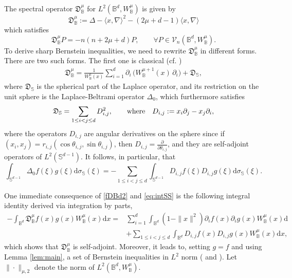\documentclass{amsart}
\theoremstyle{remark}
\def\la{{\langle}}
\def\ra{{\rangle}}
\def\d{\mathrm{d}}
\def\sph{{\mathbb{S}^{d-1}}}
\def\fD{{\mathfrak D}}
\def\t{{\theta}}
\def\s{\sigma}
\def\la{{\langle}}
\def\ra{{\rangle}}
\def\CV{{\mathcal V}}
\def\BB{{\mathbb B}}
\def\SS{{\mathbb S}}
\begin{document}
The spectral operator $\fD_\BB^\mu$ for $L^2(\BB^d, W_\BB^\mu)$ is given by \cite[(5.2.3)]{DX}
\begin{equation} \label{eq:fD_Bd}
  \fD_\BB^\mu:= \Delta - \la x, \nabla \ra^2 - (2\mu + d-1) \la x, \nabla \ra 
\end{equation}
which satisfies 
\begin{equation} \label{eq:eigenB}
  \fD^\mu_\BB P = - n (n+ 2 \mu + d) P, \qquad \forall P \in \CV_n(\BB^d, W_\BB^\mu). 
\end{equation}
To derive sharp Bernstein inequalities, we need to rewrite $\fD_\BB^\mu$ in different forms. There are two
such forms. The first one is classical (cf. \cite[Proposition 7.1]{DaiX1}) 
\begin{align}\label{fDBd2}
  \fD^{\mu}_\BB =  \frac{1}{W_\BB^\mu(x)}\sum_{i=1}^{d} \partial_{i}\,\!\big(W_\BB^{\mu+1}(x)\,\partial_{i}\big) 
    + \fD_\SS,
\end{align}
where $\fD_\SS$ is the spherical part of the Laplace operator, and its restriction on the unit sphere is the 
Laplace-Beltrami operator $\Delta_0$, which furthermore satisfies \cite[(1.8.3)]{DaiX}
\begin{align}\label{fD_SS}
\fD_\SS = \sum_{1 \le i < j \le d} D_{i,j}^2, \qquad \hbox{where} \quad  D_{i,j}: = x_i \partial_j - x_j \partial_i,
\end{align}
where the operators $D_{i,j}$ are angular derivatives on the sphere \cite[(1.8.1)]{DaiX} since if 
$(x_i,x_j) = r_{i,j}(\cos \t_{i,j}, \sin \t_{i,j})$, then $D_{i,j} = \frac{\partial}{\partial \t_{i,j}}$, and they 
are self-adjoint operators of $L^2(\sph)$. It follows, in particular, that \cite[Section 1.8]{DaiX}
\begin{equation} \label{eq:intSS}
  \int_{\sph} \Delta_0 f(\xi) g (\xi) \d \s_\SS(\xi) = -  \sum_{1\le i< j \le d} \int_{\sph} D_{i,j} f(\xi) D_{i,j} g(\xi) \d \s_\SS (\xi).
\end{equation}

One immediate consequence of \eqref{fDBd2} and \eqref{eq:intSS} is the following integral identity %
derived via integration by parts, 
\begin{align*}
  - \int_{\BB^d} \fD^\mu_\BB f(x) g(x) W_\BB^\mu(x) \d x = & \sum_{i=1}^{d} \int_{\BB^d} (1-\|x\|^2) \partial_{i}f(x) 
   \partial_{i}g(x) W_\BB^\mu (x) \d  \\ & + \sum_{1 \le i< j \le d} \int_{\BB^d} D_{i,j} f(x) D_{i,j} g(x)W_\BB^\mu(x) \d x,        
\end{align*}
which shows that $\fD_\BB^\mu$ is self-adjoint. Moreover, it leads to, setting $g = f$ and using Lemma \ref{lem:main},
a set of Bernstein inequalities in $L^2$ norm (\cite{K2022} and \cite{BX}).  Let $\|\cdot\|_{\mu,2}$ denote the norm
of $L^2(\BB^d, W_\BB^\mu)$. 
 
\end{document}
